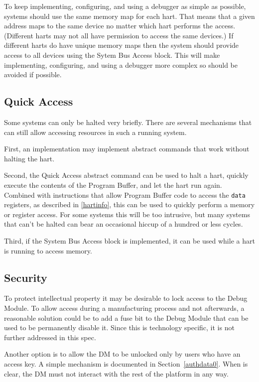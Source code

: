 \documentclass{article}
\begin{document}
To keep implementing, configuring, and using a debugger as simple as possible,
systems should use the same memory map for each hart. That means that a given
address maps to the same device no matter which hart performs the access.
(Different harts may not all have permission to access the same devices.) If
different harts do have unique memory maps then the system should provide
access to all devices using the Sytem Bus Access block.
This will make implementing,
configuring, and using a debugger more complex so should be avoided if
possible.

\subsection{Quick Access}

Some systems can only be halted very briefly. There are several mechanisms that
can still allow accessing resources in such a running system.

First, an implementation may implement abstract commands that work without
halting the hart.

Second, the Quick Access abstract command can be used to halt a hart, quickly
execute the contents of the Program Buffer, and let the hart run again.
Combined with instructions that allow Program Buffer code to access the
{\tt data} registers, as described in \ref{hartinfo}, this can be used to quickly
perform a memory or register access. For some systems this will be too
intrusive, but many systems that can't be halted can bear an occasional hiccup
of a hundred or less cycles.

Third, if the System Bus Access block is implemented, it can be used while a
hart is running to access memory.

\subsection{Security}

To protect intellectual property it may be desirable to lock access to the
Debug Module.  To allow access during a manufacturing process and not
afterwards, a reasonable solution could be to add a fuse bit to the Debug
Module that can be used to be permanently disable it. Since this is technology
specific, it is not further addressed in this spec.

Another option is to allow the DM to be unlocked only by users who  have an
access key. A simple mechanism is documented in Section~\ref{authdata0}. When
\Fauthenticated is clear, the DM must not interact with the rest of the
platform in any way.
\end{document}

